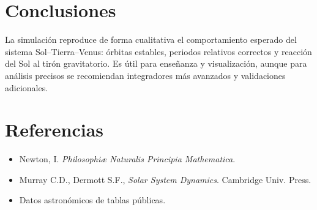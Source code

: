 \documentclass[12pt,a4paper]{article}
\begin{document}
\section{Conclusiones}
La simulación reproduce de forma cualitativa el comportamiento esperado del sistema Sol–Tierra–Venus: órbitas estables, periodos relativos correctos y reacción del Sol al tirón gravitatorio. Es útil para enseñanza y visualización, aunque para análisis precisos se recomiendan integradores más avanzados y validaciones adicionales.

\section*{Referencias}
\begin{itemize}
    \item Newton, I. \emph{Philosophiæ Naturalis Principia Mathematica}.
    \item Murray C.D., Dermott S.F., \emph{Solar System Dynamics}. Cambridge Univ. Press.
    \item Datos astronómicos de tablas públicas.
\end{itemize}
\end{document}
